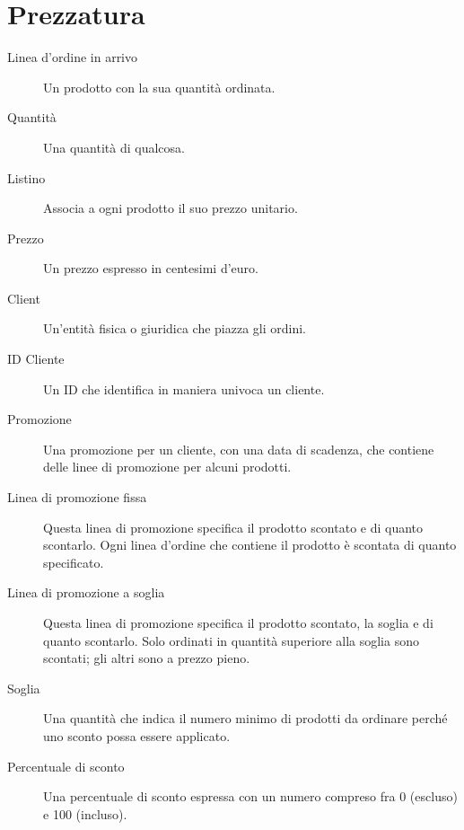 \section{Prezzatura}
\begin{description}
    \item[Linea d'ordine in arrivo] Un prodotto con la sua quantità ordinata.
    \item[Quantità] Una quantità di qualcosa.
    \item[Listino] Associa a ogni prodotto il suo prezzo unitario.
    \item[Prezzo] Un prezzo espresso in centesimi d'euro.
    \item[Client] Un'entità fisica o giuridica che piazza gli ordini.
    \item[ID Cliente] Un ID che identifica in maniera univoca un cliente.
    \item[Promozione] Una promozione per un cliente, con una data di scadenza, che contiene delle linee di promozione per alcuni prodotti.
    \item[Linea di promozione fissa] Questa linea di promozione specifica il prodotto scontato e di quanto scontarlo. Ogni linea d'ordine che contiene il prodotto è scontata di quanto specificato.
    \item[Linea di promozione a soglia] Questa linea di promozione specifica il prodotto scontato, la soglia e di quanto scontarlo. Solo ordinati in quantità superiore alla soglia sono scontati; gli altri sono a prezzo pieno.
    \item[Soglia] Una quantità che indica il numero minimo di prodotti da ordinare perché uno sconto possa essere applicato.
    \item[Percentuale di sconto] Una percentuale di sconto espressa con un numero compreso fra 0 (escluso) e 100 (incluso).
\end{description}